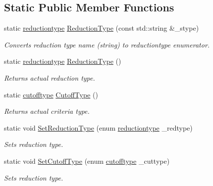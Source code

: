 \subsection*{Static Public Member Functions}
\begin{DoxyCompactItemize}
\item 
static \hyperlink{class_go_s_u_m_1_1_c_reduction_a191434138cff8df283fa2c2e2a8e653a}{reductiontype} \hyperlink{class_go_s_u_m_1_1_c_reduction_a1f24ffaa672f459158df058ba4ec1f5f}{Reduction\-Type} (const std\-::string \&\-\_\-stype)
\begin{DoxyCompactList}\small\item\em Converts reduction type name (string) to reductiontype enumerator. \end{DoxyCompactList}\item 
static \hyperlink{class_go_s_u_m_1_1_c_reduction_a191434138cff8df283fa2c2e2a8e653a}{reductiontype} \hyperlink{class_go_s_u_m_1_1_c_reduction_acbbbd845185c42a0738409f98f2bd9ef}{Reduction\-Type} ()
\begin{DoxyCompactList}\small\item\em Returns actual reduction type. \end{DoxyCompactList}\item 
static \hyperlink{class_go_s_u_m_1_1_c_reduction_aa520ced4c505a26533dd1787c8055f7b}{cutofftype} \hyperlink{class_go_s_u_m_1_1_c_reduction_af88b4b41fb89ee64c1184950a3fd7c4a}{Cutoff\-Type} ()
\begin{DoxyCompactList}\small\item\em Returns actual criteria type. \end{DoxyCompactList}\item 
static void \hyperlink{class_go_s_u_m_1_1_c_reduction_a8102874859f6d79a6232b7a7e4d5f949}{Set\-Reduction\-Type} (enum \hyperlink{class_go_s_u_m_1_1_c_reduction_a191434138cff8df283fa2c2e2a8e653a}{reductiontype} \-\_\-redtype)
\begin{DoxyCompactList}\small\item\em Sets reduction type. \end{DoxyCompactList}\item 
static void \hyperlink{class_go_s_u_m_1_1_c_reduction_a760a89a20279eb4133c7de3514309fe0}{Set\-Cutoff\-Type} (enum \hyperlink{class_go_s_u_m_1_1_c_reduction_aa520ced4c505a26533dd1787c8055f7b}{cutofftype} \-\_\-cuttype)
\begin{DoxyCompactList}\small\item\em Sets reduction type. \end{DoxyCompactList}\end{DoxyCompactItemize}

